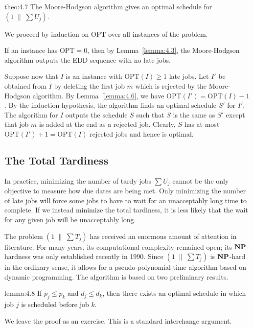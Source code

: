 \begin{theo}{theo:4.7}
    The Moore-Hodgson algorithm gives an optimal schedule for 
    $(1\;\|\;\sum U_j)$. 
\end{theo}
\begin{pf}
    We proceed by induction on $\text{OPT}$ over all instances of the problem. 

    If an instance has $\text{OPT} = 0$, then by Lemma~\ref{lemma:4.3}, the 
    Moore-Hodgson algorithm outputs the EDD sequence with no late jobs. 

    Suppose now that $I$ is an instance with $\text{OPT}(I) \geq 1$ late 
    jobs. Let $I'$ be obtained from $I$ by deleting the first job $m$ 
    which is rejected by the Moore-Hodgson algorithm. By Lemma~\ref{lemma:4.6}, 
    we have $\text{OPT}(I') = \text{OPT}(I) - 1$. By the induction hypothesis, 
    the algorithm finds an optimal schedule $S'$ for $I'$. The algorithm 
    for $I$ outputs the schedule $S$ such that $S$ is the same as $S'$ 
    except that job $m$ is added at the end as a rejected job. Clearly, 
    $S$ has at most $\text{OPT}(I') + 1 = \text{OPT}(I)$ rejected jobs 
    and hence is optimal. 
\end{pf}

\subsection{The Total Tardiness} \label{subsec:4.3}
In practice, minimizing the number of tardy jobs $\sum U_j$ cannot be the 
only objective to measure how due dates are being met. Only minimizing 
the number of late jobs will force some jobs to have to wait for an 
unacceptably long time to complete. If we instead minimize the total 
tardiness, it is less likely that the wait for any given job will be 
unacceptably long. 

The problem $(1\;\|\;\sum T_j)$ has received an enormous amount of attention 
in literature. For many years, its computational complexity remained open; 
its $\operatorname{\textbf{NP}}$-hardness was only established recently in 1990. Since 
$(1\;\|\;\sum T_j)$ is $\operatorname{\textbf{NP}}$-hard in the ordinary sense, it allows for a 
pseudo-polynomial time algorithm based on dynamic programming. The 
algorithm is based on two preliminary results. 

\begin{lemma}{lemma:4.8}
    If $p_j \leq p_k$ and $d_j \leq d_k$, then there exists an optimal schedule 
    in which job $j$ is scheduled before job $k$. 
\end{lemma}
\begin{pf}
    We leave the proof as an exercise. This is a standard interchange 
    argument. 
\end{pf}

